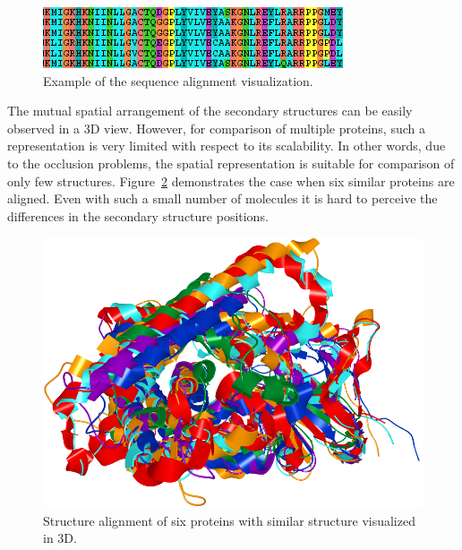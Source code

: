 \documentclass[twocolumn]{bmcart}%
\begin{document}
\begin{figure}[th]
  \centering
  \includegraphics[width=0.9\columnwidth]{pics/align.png}
  \caption{Example of the sequence alignment visualization.}
  \label{fig:align}
\end{figure}

The mutual spatial arrangement of the secondary structures can be easily observed in a 3D view. 
However, for comparison of multiple proteins, such a representation is very limited with respect to its scalability.
In other words, due to the occlusion problems, the spatial representation is suitable for comparison of only few structures. 
Figure~\ref{fig:many} demonstrates the case when six similar proteins are aligned.
Even with such a small number of molecules it is hard to perceive the differences in the secondary structure positions.


\begin{figure}[th]
  \centering
  \includegraphics[width=0.9\columnwidth]{pics/many.png}
  \caption{Structure alignment of six proteins with similar structure visualized in 3D.}
  \label{fig:many}
\end{figure}
\end{document}
